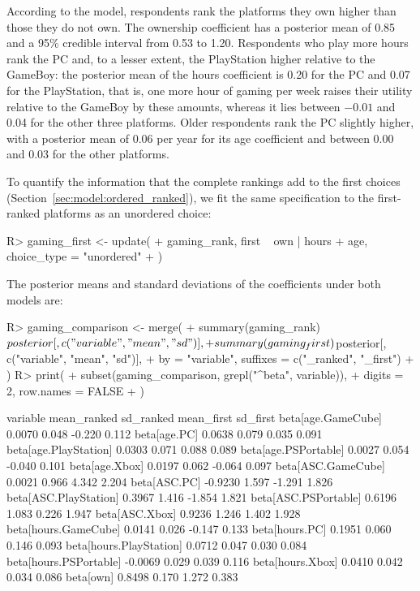 \documentclass[article,shortnames]{jss}
\begin{document}
%
According to the model, respondents rank the platforms they own higher than
those they do not own. The ownership coefficient has a posterior mean of
0.85 and a 95\% credible
interval from 0.53 to 1.20. Respondents who play more hours rank the PC and, to
a lesser extent, the PlayStation higher relative to the GameBoy: the posterior
mean of the hours coefficient is 0.20 for the PC and 0.07 for the PlayStation,
that is, one more hour of gaming per week raises their utility relative to the
GameBoy by these amounts, whereas it lies between $-0.01$ and 0.04 for the other
three platforms. Older respondents rank the PC slightly higher, with a posterior
mean of 0.06 per year for its age coefficient and between 0.00 and 0.03 for the
other platforms.

To quantify the information that the complete rankings add to the first choices
(Section~\ref{sec:model:ordered_ranked}), we fit the same specification to the
first-ranked platforms as an unordered choice:
%
\begin{Schunk}
\begin{Sinput}
R> gaming_first <- update(
+    gaming_rank, first ~ own | hours + age, choice_type = "unordered"
+  )
\end{Sinput}
\end{Schunk}
%
The posterior means and standard deviations of the coefficients under both
models are:
%
\begin{Schunk}
\begin{Sinput}
R> gaming_comparison <- merge(
+    summary(gaming_rank)$posterior[, c("variable", "mean", "sd")],
+    summary(gaming_first)$posterior[, c("variable", "mean", "sd")],
+    by = "variable", suffixes = c("_ranked", "_first")
+  )
R> print(
+    subset(gaming_comparison, grepl("^beta", variable)),
+    digits = 2, row.names = FALSE
+  )
\end{Sinput}
\begin{Soutput}
                variable mean_ranked sd_ranked mean_first sd_first
      beta[age.GameCube]      0.0070     0.048     -0.220    0.112
            beta[age.PC]      0.0638     0.079      0.035    0.091
   beta[age.PlayStation]      0.0303     0.071      0.088    0.089
    beta[age.PSPortable]      0.0027     0.054     -0.040    0.101
          beta[age.Xbox]      0.0197     0.062     -0.064    0.097
      beta[ASC.GameCube]      0.0021     0.966      4.342    2.204
            beta[ASC.PC]     -0.9230     1.597     -1.291    1.826
   beta[ASC.PlayStation]      0.3967     1.416     -1.854    1.821
    beta[ASC.PSPortable]      0.6196     1.083      0.226    1.947
          beta[ASC.Xbox]      0.9236     1.246      1.402    1.928
    beta[hours.GameCube]      0.0141     0.026     -0.147    0.133
          beta[hours.PC]      0.1951     0.060      0.146    0.093
 beta[hours.PlayStation]      0.0712     0.047      0.030    0.084
  beta[hours.PSPortable]     -0.0069     0.029      0.039    0.116
        beta[hours.Xbox]      0.0410     0.042      0.034    0.086
               beta[own]      0.8498     0.170      1.272    0.383
\end{Soutput}
\end{Schunk}
\end{document}
